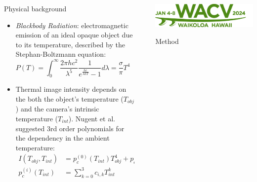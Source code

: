 \documentclass[final]{beamer}
\newlength{\sepwidth}
\newlength{\colwidth}
\newcommand{\separatorcolumn}{\begin{column}{\sepwidth}\end{column}}
\begin{document}
\begin{frame}[t]
\begin{columns}[t]
\begin{column}{\colwidth}
  \begin{exampleblock}{Physical background}
    \begin{itemize}
      \item \emph{Blackbody Radiation}: electromagnetic emission of an ideal opaque object due to its temperature, described by the Stephan-Boltzmann equation:
            \begin{equation*} \label{eq:stephan-boltzmann-ideal}
                P(T) = \int_0^\infty \frac{2\pi hc^2}{\lambda^5}\frac{1}{e^{\frac{hc}{\lambda kT}} - 1} d\lambda = \frac{\sigma}{\pi} T^4 \; \; \left[W sr^{-1} m^{-2}\right]
            \end{equation*}
      \item Thermal image intensity depends on the both the object's temperature ($T_\mathit{obj}$) and the camera's intrinsic temperature ($T_\mathit{int}$). 
            Nugent et al. \cite{10.1117/1.OE.52.6.061304} suggested 3rd order polynomials for the dependency in the ambient temperature:
            \begin{equation*} \label{eq:IntensityVsTemperatures}
              \begin{split}            
                I(T_\mathit{obj}, T_\mathit{int}) &= p^{(0)}_c(T_\mathit{int}) T^4_\mathit{obj} + p^{(1)}_c(T_\mathit{int})\\
                p^{(i)}_c(T_\mathit{int}) &= \sum_{k=0}^3  c_{i,k} T_\mathit{int}^k
            \end{split}
            \end{equation*}
    \end{itemize}
  \end{exampleblock}

\end{column}

\separatorcolumn

\begin{column}{\colwidth}

  \centering\includegraphics[width=0.75\linewidth]{../figs/logos/WACV-Logo_2024_dgreen.png}
  \vspace{0.85cm}
  \begin{alertblock}{Method}


\end{alertblock}
\end{column}
\end{columns}
\end{frame}
\end{document}
